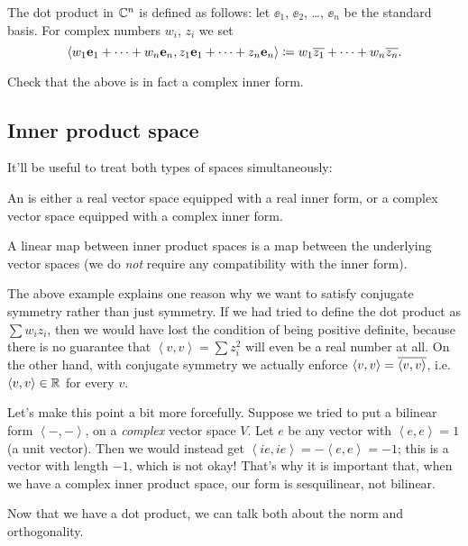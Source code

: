 \begin{example}
	[$\CC^n$]
	The dot product in $\CC^n$ is defined as follows:
	let $\ee_1$, $\ee_2$, \dots, $\ee_n$ be the standard basis.
	For complex numbers $w_i$, $z_i$ we set
	\[ 
		\left< w_1 \mathbf e_1 + \dots + w_n \mathbf e_n, z_1 \mathbf e_1 + \dots + z_n \mathbf e_n \right>
		\coloneqq w_1\overline{z_1} + \dots + w_n \overline{z_n}.
	\]
\end{example}
\begin{ques}
	Check that the above is in fact a complex inner form.
\end{ques}

\subsection{Inner product space}
It'll be useful to treat both types of spaces simultaneously:
\begin{definition}
	An  is either a real vector space
	equipped with a real inner form,
	or a complex vector space equipped with a complex inner form.

	A linear map between inner product spaces
	is a map between the underlying vector spaces
	(we do \emph{not} require any compatibility with the inner form).
\end{definition}

\begin{remark}
	The above example explains one reason why we want
	to satisfy conjugate symmetry rather than just symmetry.
	If we had tried to define the dot product as $\sum w_i z_i$,
	then we would have lost the condition of being positive definite,
	because there is no guarantee that
	$\left< v,v \right> = \sum z_i^2$ will even be a real number at all.
	On the other hand, with conjugate symmetry
	we actually enforce $\left< v,v \right> = \overline{\left< v,v \right>}$,
	i.e.\ $\left< v,v \right> \in \mathbb R$ for every $v$.

	Let's make this point a bit more forcefully.
	Suppose we tried to put a bilinear form $\left< -, -\right>$,
	on a \emph{complex} vector space $V$.
	Let $e$ be any vector with $\left< e, e \right> = 1$ (a unit vector).
	Then we would instead get
	$\left< ie, ie \right> = - \left< e,e \right> = -1$;
	this is a vector with length $-1$, which is not okay!
	That's why it is important that,
	when we have a complex inner product space,
	our form is sesquilinear, not bilinear.
\end{remark}

Now that we have a dot product,
we can talk both about the norm and orthogonality.

